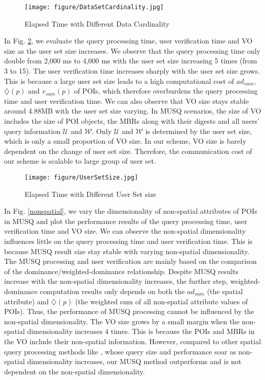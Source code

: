 \documentclass[10pt, conference, compsocconf]{IEEEtran}
\begin{document}
\begin{figure}[htbp]
	\centering
	\texttt{[image: figure/DataSetCardinality.jpg]}
	\caption{Elapsed Time with Different Data Cardinality}\label{datasetcardinality}
\end{figure}

In Fig. \ref{UserSetSize}, we evaluate the query processing time, user verification time and VO size as the user set size increases. We observe that the query processing time only double from 2,000 ms to 4,000 ms with the user set size increasing 5 times (from 3 to 15). The user verification time increases sharply with the user set size grows. This is because a large user set size leads to a high computational cost of $ad_{sum}$, $\diamondsuit(p)$ and $v_{sum}(p)$ of POIs, which therefore overburdens the query processing time and user verification time. We can also observe that VO size stays stable around 4.88MB with the user set size varying. In MUSQ scenarios, the size of VO includes the size of POI objects, the MBRs along with their digests and all users' query information $\mathcal{U}$ and $\mathcal{W}$. Only $\mathcal{U}$ and $\mathcal{W}$ is determined by the user set size, which is only a small proportion of VO size. In our scheme, VO size is barely dependent on the change of user set size. Therefore, the communication cost of our scheme is scalable to large group of user set. 

\begin{figure}[htbp]
	\centering
	\texttt{[image: figure/UserSetSize.jpg]}
	\caption{Elapsed Time with Different User Set size}\label{UserSetSize}
\end{figure}

In Fig. \ref{nonspatial}, we vary the dimensionality of non-spatial attributes of POIs in MUSQ and plot the performance results of the query processing time, user verification time and VO size. We can observe the non-spatial dimensionality influences little on the query processing time and user verification time. This is because MUSQ result size stay stable with varying non-spatial dimensionality.
The MUSQ processing and user verification are mainly based on the comparison of the dominance/weighted-dominance relationship. Despite MUSQ results increase with the non-spatial dimensionality increases, the further step, weighted-dominance computation results only depends on both the $ad_{sum}$ (the spatial attribute) and $\diamondsuit(p)$ (the weighted sum of all non-spatial attribute values of POIs). Thus, the performance of MUSQ processing cannot be influenced by the non-spatial dimensionality. The VO size grows by a small margin when the non-spatial dimensionality increases 4 times. This is because the POIs and MBRs in the VO include their non-spatial information. However, compared to other spatial query processing methods like \cite{lin2011authentication, lin2014authenticating}, whose query size and performance soar as non-spatial dimensionality increases, our MUSQ method outperforms and is not dependent on the non-spatial dimensionality. 
\end{document}
